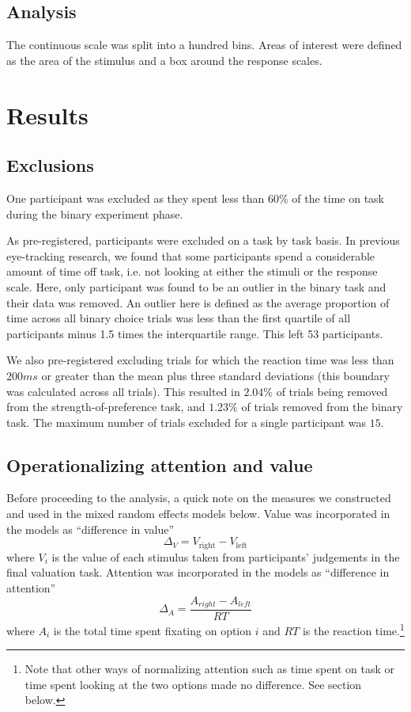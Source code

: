 \documentclass[12pt]{article}
\begin{document}
\subsection{Analysis}
The continuous scale was split into a hundred bins. Areas of interest were defined as the area of the stimulus and a box around the response scales. 

\section{Results}

\subsection{Exclusions}
One participant was excluded as they spent less than 60\% of the time on task during the binary experiment phase. 

As pre-registered, participants were excluded on a task by task basis. In previous eye-tracking research, we found that some participants spend a considerable amount of time off task, i.e. not looking at either the stimuli or the response scale. Here, only participant was found to be an outlier in the binary task and their data was removed. An outlier here is defined as the average proportion of time across all binary choice trials was less than the first quartile of all participants minus 1.5 times the interquartile range. This left 53 participants. 

We also pre-registered excluding trials for which the reaction time was less than $200ms$ or greater than the mean plus three standard deviations (this boundary was calculated across all trials). This resulted in $2.04\%$ of trials being removed from the strength-of-preference task, and $1.23\%$ of trials removed from the binary task. The maximum number of trials excluded for a single participant was $15$. 

\subsection{Operationalizing attention and value}
Before proceeding to the analysis, a quick note on the measures we constructed and used in the mixed random effects models below. Value was incorporated in the models as ``difference in value'' 
\begin{equation}
	\Delta_V = V_\text{right} - V_\text{left}	
\end{equation}
where $V_i$ is the value of each stimulus taken from participants' judgements in the final valuation task. Attention was incorporated in the models as ``difference in attention''
\begin{equation}
	\Delta_A = \frac{A_{right}-A_{left}}{RT}	
\end{equation}
where $A_i$ is the total time spent fixating on option $i$ and $RT$ is the reaction time.\footnote{Note that other ways of normalizing attention such as time spent on task or time spent looking at the two options made no difference. See section below.}
\end{document}
